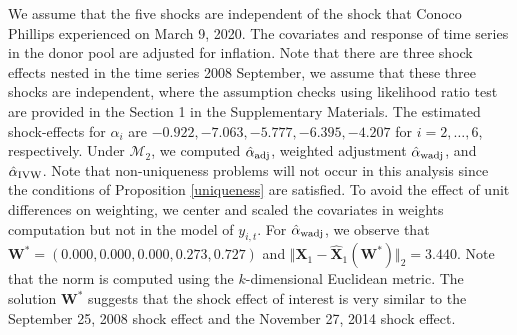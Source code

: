 \documentclass[11pt]{article}
\def\mbf#1{\mathbf{#1}} %
\def\mc#1{\mathcal{#1}} %
\theoremstyle{definition}
\begin{document}
\begin{enumerate}
\end{enumerate}


We assume that the five shocks are independent of the shock that Conoco Phillips experienced on March 9, 2020. The covariates and response of time series in the donor pool are adjusted for inflation. Note that there are three shock effects nested in the time series 2008 September, we assume that these three shocks are independent, where the assumption checks using likelihood ratio test are provided in the Section 1 in the Supplementary Materials. The estimated shock-effects for $\alpha_i$ are $-0.922, -7.063, -5.777, -6.395, -4.207$ for $i = 2, \ldots, 6$, respectively. Under $\mc{M}_{2}$, we computed $\hat{\alpha}_{\rm adj}$, weighted adjustment $\hat{\alpha}_{\rm wadj}$, and $\hat{\alpha}_{\rm IVW}$. Note that non-uniqueness problems will not occur in this analysis since the conditions of Proposition \ref{uniqueness} are satisfied. To avoid the effect of  unit differences on weighting, we center and scaled the covariates in weights computation but not in the model of $y_{i,t}$. For $\hat{\alpha}_{\rm wadj}$, we observe that 
$
  \mathbf{W}^*= (0.000,0.000, 0.000, 0.273, 0.727)
$
and 
$
  \Vert\mbf{X}_1-\hat{\mbf{X}}_1(\mbf{W}^*)\Vert_2 = 3.440.
$
Note that the norm is computed using the $k$-dimensional Euclidean metric. The solution $\mathbf{W}^*$ suggests that the shock effect of interest is very similar to the September 25, 2008 shock effect and  the November 27, 2014 shock effect. 
\end{document}
